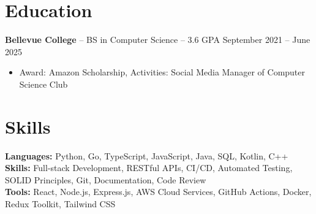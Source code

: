 \documentclass[11pt]{article}       %
\begin{document}

\vspace{-18.5pt}

\section*{Education}
\textbf{Bellevue College} -- BS in Computer Science -- 3.6 GPA \hfill September 2021 -- June 2025\\
\vspace{-9pt}
\begin{itemize}
  \item Award: Amazon Scholarship, Activities: Social Media Manager of Computer Science Club
\end{itemize}

\vspace{-18.5pt}

\section*{Skills}
\textbf{Languages:} Python, Go, TypeScript, JavaScript, Java, SQL, Kotlin, C++\\
\textbf{Skills:} Full-stack Development, RESTful APIs, CI/CD, Automated Testing, SOLID Principles, Git, Documentation, Code Review\\
\textbf{Tools:} React, Node.js, Express.js, AWS Cloud Services, GitHub Actions, Docker, Redux Toolkit, Tailwind CSS\\

\vspace{-6.5pt}
\end{document}
